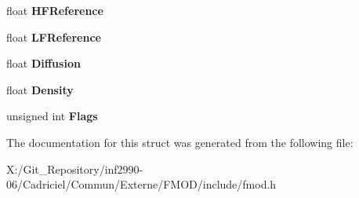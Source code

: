 \begin{DoxyCompactItemize}
\item 
\hypertarget{struct_f_m_o_d___r_e_v_e_r_b___p_r_o_p_e_r_t_i_e_s_ac0d48e7775cc35e434535d7b0f41d425}{float {\bfseries H\-F\-Reference}}\label{struct_f_m_o_d___r_e_v_e_r_b___p_r_o_p_e_r_t_i_e_s_ac0d48e7775cc35e434535d7b0f41d425}

\item 
\hypertarget{struct_f_m_o_d___r_e_v_e_r_b___p_r_o_p_e_r_t_i_e_s_ac3edfdcc94df619aa11f5163dfacbfd4}{float {\bfseries L\-F\-Reference}}\label{struct_f_m_o_d___r_e_v_e_r_b___p_r_o_p_e_r_t_i_e_s_ac3edfdcc94df619aa11f5163dfacbfd4}

\item 
\hypertarget{struct_f_m_o_d___r_e_v_e_r_b___p_r_o_p_e_r_t_i_e_s_ae4b36833e4d30de592c954af2f0c55b3}{float {\bfseries Diffusion}}\label{struct_f_m_o_d___r_e_v_e_r_b___p_r_o_p_e_r_t_i_e_s_ae4b36833e4d30de592c954af2f0c55b3}

\item 
\hypertarget{struct_f_m_o_d___r_e_v_e_r_b___p_r_o_p_e_r_t_i_e_s_a3672d989ace5e2dc4450b7677fa83f75}{float {\bfseries Density}}\label{struct_f_m_o_d___r_e_v_e_r_b___p_r_o_p_e_r_t_i_e_s_a3672d989ace5e2dc4450b7677fa83f75}

\item 
\hypertarget{struct_f_m_o_d___r_e_v_e_r_b___p_r_o_p_e_r_t_i_e_s_a8e2786c436b8b3fa9bc1cbfb3f3b629c}{unsigned int {\bfseries Flags}}\label{struct_f_m_o_d___r_e_v_e_r_b___p_r_o_p_e_r_t_i_e_s_a8e2786c436b8b3fa9bc1cbfb3f3b629c}

\end{DoxyCompactItemize}


The documentation for this struct was generated from the following file\-:\begin{DoxyCompactItemize}
\item 
X\-:/\-Git\-\_\-\-Repository/inf2990-\/06/\-Cadriciel/\-Commun/\-Externe/\-F\-M\-O\-D/include/fmod.\-h\end{DoxyCompactItemize}
